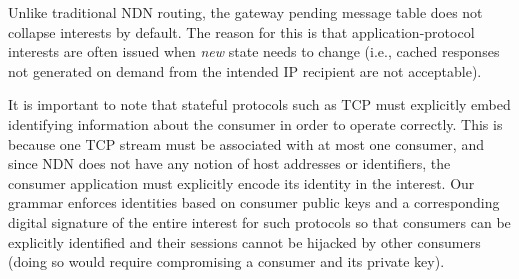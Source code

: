 Unlike traditional NDN routing, the gateway pending message table does not collapse interests by default. The reason for this is that application-protocol interests are often issued when \emph{new} state needs to change (i.e., cached responses not generated on demand from the intended IP recipient are not acceptable). 

It is important to note that stateful protocols such as TCP must explicitly embed identifying information about the consumer in order to operate correctly. This is because one TCP stream must be associated with at most one consumer, and since NDN does not have any notion of host addresses or identifiers, the consumer application must explicitly encode its identity in the interest. Our grammar enforces identities based on consumer public keys and a corresponding digital signature of the entire interest for such protocols so that consumers can be explicitly identified and their sessions cannot be hijacked by other consumers (doing so would require compromising a consumer and its private key).

